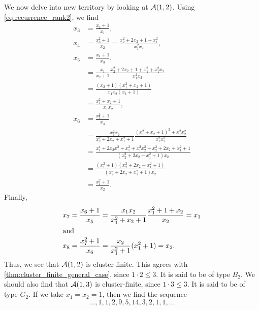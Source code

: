 \begin{example}
	We now delve into new territory by looking at $\mathcal{A}(1,2)$. Using
	\cref{eq:recurrence_rank2}, we find
	\begin{align*}
		x_3 & = \frac{x_2 + 1}{x_1},                                                                                     \\
		x_4 & = \frac{x_3^2 + 1}{x_2} =  \frac{x_2^2 + 2x_2 + 1 + x_1^2}{x_1^2 x_2},                                     \\
		x_5 & = \frac{x_4 + 1}{x_3},                                                                                     \\
		    & = \frac{x_1}{x_2+1}\frac{x_2^2 + 2x_2 +1 + x_1^2 + x_1^2 x_2}{x_1^2 x_2}                                   \\
		    & = \frac{(x_2 +1)(x_1^2 + x_2 + 1)}{x_1 x_2(x_2 + 1)}                                                       \\
		    & = \frac{x_1^2 + x_2 + 1}{x_1x_2},                                                                          \\
		x_6 & = \frac{x_5^2 +1}{x_4}                                                                                     \\
		    & = \frac{x_1^2 x_2}{x_2^2 + 2x_2 + x_1^2 + 1}\frac{(x_1^2 + x_2 + 1)^2 + x_1^2 x_2^2}{x_1^2x_2^2}           \\
		    & = \frac{x_1^4 + 2x_2x_1^2 + x_1^2 + x_1^2 x_2^2+ x_2^2 + 2 x_2 + x_1^2 + 1}{(x_2^2 + 2x_2 + x_1^2 + 1)x_2} \\
		    & = \frac{(x_1^2 + 1)(x_2^2 + 2x_2 + x_1^2 + 1)}{(x_2^2 + 2x_2 + x_1^2 + 1)x_2}                              \\
		    & = \frac{x_1^2 + 1}{x_2}.
	\end{align*}
	Finally,
	\begin{align*}
		x_7 & = \frac{x_6 +1}{x_5} = \frac{x_1x_2}{x_1^2 + x_2 + 1}\frac{x_1^2 +1 + x_2}{x_2} = x_1 \\
		\shortintertext{and}
		x_8 & = \frac{x_7^2 + 1}{x_6} = \frac{x_2}{x_1^2 + 1}(x_1^2 + 1) = x_2.
	\end{align*}
	Thus, we see that $\mathcal{A}(1,2)$ is cluster-finite. This agrees with
	\cref{thm:cluster_finite_general_case}, since $1 \cdot 2 \leq 3$. It is said to be of type $B_2$. We should also find
	that $\mathcal{A}(1,3)$ is cluster-finite, since $1 \cdot 3 \leq 3$. It is said to be of type $G_2$. If we take $x_1 = x_2 = 1$, then we find the
	sequence
	\begin{equation*}
		\dots, 1, 1, 2, 9, 5, 14, 3, 2, 1, 1, \dots

\end{equation*}
\end{example}
